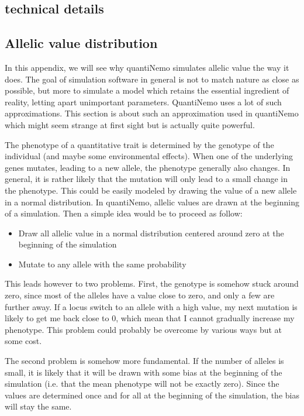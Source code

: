 \documentclass[letterpaper,12pt,oneside]{book}
\begin{document}
\begin{appendices}
\chapter{technical details}\label{chap:TechnicalDetails}
\section{Allelic value distribution}\label{sec:AllelicValueDistribution}
In this appendix, we will see why quantiNemo simulates allelic value the way it does. 
The goal of simulation software in general is not to match nature as close as possible, but more to simulate a model which retains the essential ingredient of reality, letting apart unimportant parameters. QuantiNemo uses a lot of such approximations. This section is about such an approximation used in quantiNemo which might seem strange at first sight but is actually quite powerful. 

The phenotype of a quantitative trait is determined by the genotype of the individual (and maybe some environmental effects). When one of the underlying genes mutates, leading to a new allele, the phenotype generally also changes. In general, it is rather likely that the mutation will only lead to a small change in the phenotype. This could be easily modeled by drawing the value of a new allele in a normal distribution.  In quantiNemo, allelic values are drawn at the beginning of a simulation. Then a simple idea would be to proceed as follow:
\begin{itemize}
\item	Draw all allelic value in a normal distribution centered around zero at the beginning of the simulation
\item 	Mutate to any allele with the same probability
\end{itemize}
This leads however to two problems. First, the genotype is somehow stuck around zero, since most of the alleles have a value close to zero, and only a few are further away. If a locus switch to an allele with a high value, my next mutation is likely to get me back close to 0, which mean that I cannot gradually increase my phenotype. This problem could probably be overcome by various ways but at some cost. 

The second problem is somehow more fundamental. If the number of alleles is small, it is likely that it will be drawn with some bias at the beginning of the simulation (i.e. that the mean phenotype will not be exactly zero). Since the values are determined once and for all at the beginning of the simulation, the bias will stay the same. 


\end{appendices}
\end{document}
